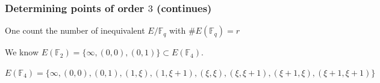 \documentclass[12pt,handout]{beamer} %
\newcommand{\F}{\mathbb F}
\theoremstyle{definition}
\newtheorem{Note}[theorem]{\translate{Note}}
\begin{document}
\begin{frame}\frametitle{Determining points of order $3$ (continues)}

\begin{block}
{One count the number of inequivalent $E/\F_q$ with $\#E(\F_q)=r$}
\end{block}

\begin{example}[A curve over $\F_4=\F_2(\xi), \xi^2=\xi+1;\qquad E: y^2+y=x^3$]\pause
 We know $E(\F_2)=\{\infty, (0,0), (0,1)\}\subset E(\F_4).$\pause\\
 \begin{scriptsize}$E(\F_4)=\{\infty,(0,0),(0,1),(1,\xi),(1,\xi+1),(\xi,\xi),(\xi,\xi+1),
 (\xi+1,\xi),(\xi+1,\xi+1)\}$\end{scriptsize} \pause

\end{example}



\end{frame}
\end{document}
